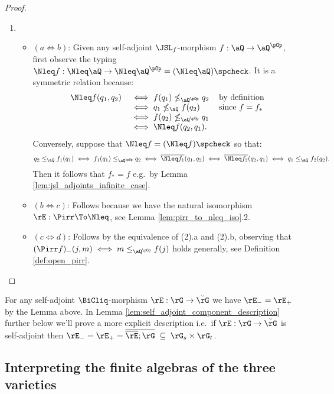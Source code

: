 \documentclass{article}
\begin{document}
\begin{proof}
\begin{enumerate}
\begin{itemize}
\end{itemize}

\item
\begin{itemize}
\item
$(a \iff b)$: Given any self-adjoint $\JSL_f$-morphism $f : \aQ \to \aQ^{\pOp}$, first observe the typing $\Nleq f : \Nleq\aQ \to \Nleq\aQ^{\pOp} = (\Nleq\aQ)\spcheck$. It is a symmetric relation because:
\[
\begin{tabular}{lll}
$\Nleq f(q_1,q_2)$
&
$\iff f(q_1) \nleq_{\aQ^{\pOp}} q_2$
& by definition
\\&
$\iff q_1 \nleq_{\aQ} f(q_2)$
& since $f = f_*$
\\&
$\iff f(q_2) \nleq_{\aQ^{\pOp}} q_1$
\\&
$\iff \Nleq f(q_2,q_1)$.
\end{tabular}
\]
Conversely, suppose that $\Nleq f = (\Nleq f)\spcheck$ so that:
\[
q_2 \leq_\aQ f_1(q_1)
\iff
f_1(q_1) \leq_{\aQ^{\pOp}} q_2
\iff
\overline{\Nleq f_1}(q_1,q_2)
\iff
\overline{\Nleq f_2}(q_2,q_1)
\iff
q_1 \leq_\aQ f_2(q_2).
\]
Then it follows that $f_* = f$ e.g.\ by Lemma \ref{lem:jsl_adjoints_infinite_case}.

\item
$(b \iff c)$: Follows because we have the natural isomorphism $\rE : \Pirr \To \Nleq$, see Lemma \ref{lem:pirr_to_nleq_iso}.2.

\item
$(c \iff d)$: Follows by the equivalence of (2).a and (2).b, observing that $(\Pirr f)_-(j,m) \iff m \leq_{\aQ^{\pOp}} f(j)$ holds generally, see Definition \ref{def:open_pirr}.

\end{itemize}
\end{enumerate}
\end{proof}


\begin{note}
For any self-adjoint $\BiCliq$-morphism $\rE : \rG \to \breve{\rG}$ we have $\rE_- = \rE_+$ by the Lemma above. In Lemma \ref{lem:self_adjoint_component_description} further below we'll prove a more explicit description i.e.\ if $\rE : \rG \to \breve{\rG}$ is self-adjoint then $\rE_- = \rE_+ = \overline{\overline{\rE} ; \rG} \; \subseteq \; \rG_s \times \rG_t$. \endbox
\end{note}


\subsection{Interpreting the finite algebras of the three varieties}
\end{document}
